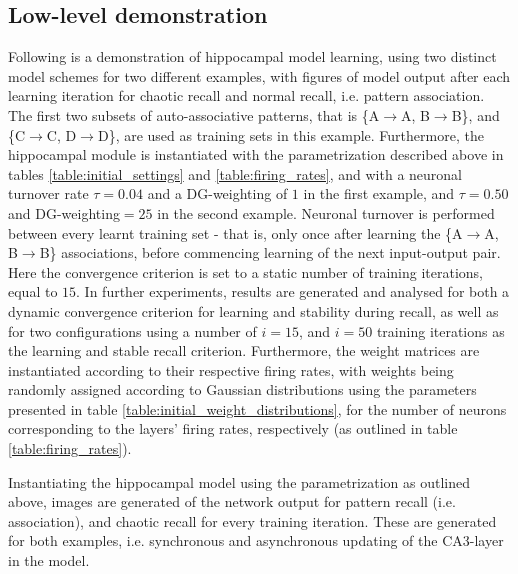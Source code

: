 \subsection{Low-level demonstration}

Following is a demonstration of hippocampal model learning, using two distinct model schemes for two different examples, with figures of model output after each learning iteration for chaotic recall and normal recall, i.e. pattern association. The first two subsets of auto-associative patterns, that is \{A$\rightarrow$A, B$\rightarrow$B\}, and \{C$\rightarrow$C, D$\rightarrow$D\}, are used as training sets in this example.
Furthermore, the hippocampal module is instantiated with the parametrization described above in tables \ref{table:initial_settings} and \ref{table:firing_rates}, and with a neuronal turnover rate $\tau = 0.04$ and a DG-weighting of $1$ in the first example, and $\tau=0.50$ and DG-weighting$=25$ in the second example. Neuronal turnover is performed between every learnt training set - that is, only once after learning the \{A$\rightarrow$A, B$\rightarrow$B\} associations, before commencing learning of the next input-output pair. Here the convergence criterion is set to a static number of training iterations, equal to $15$.
In further experiments, results are generated and analysed for both a dynamic convergence criterion for learning and stability during recall, as well as for two configurations using a number of $i=15$, and $i=50$ training iterations as the learning and stable recall criterion. Furthermore, the weight matrices are instantiated according to their respective firing rates, with weights being randomly assigned according to Gaussian distributions using the parameters presented in table \ref{table:initial_weight_distributions}, for the number of neurons corresponding to the layers' firing rates, respectively (as outlined in table \ref{table:firing_rates}).

Instantiating the hippocampal model using the parametrization as outlined above, images are generated of the network output for pattern recall (i.e. association), and chaotic recall for every training iteration. These are generated for both examples, i.e. synchronous and asynchronous updating of the CA3-layer in the model.

